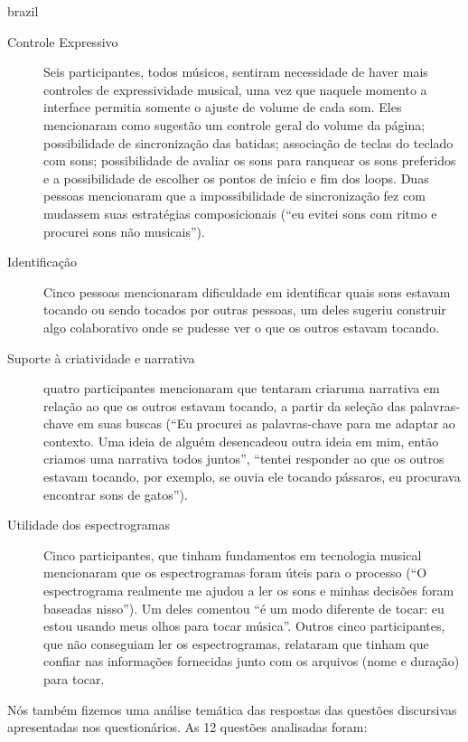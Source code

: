 \begin{otherlanguage*}{brazil}
\begin{description}
 \item[Controle Expressivo] Seis participantes, todos músicos, sentiram necessidade de haver mais controles de expressividade musical, uma vez que naquele momento a interface permitia somente o ajuste de volume de cada som. Eles mencionaram como sugestão um controle geral do volume da página; possibilidade de sincronização das batidas; associação de teclas do teclado com sons; possibilidade de avaliar os sons para ranquear os sons preferidos e a possibilidade de escolher os pontos de início e fim dos loops. Duas pessoas mencionaram que a impossibilidade de sincronização fez com mudassem suas estratégias composicionais (``eu evitei sons com ritmo e procurei sons não musicais'').

  \item[Identificação] Cinco pessoas mencionaram dificuldade em identificar quais sons estavam tocando ou sendo tocados por outras pessoas, um deles sugeriu construir algo colaborativo onde se pudesse ver o que os outros estavam tocando.

\item[Suporte à criatividade e narrativa] quatro participantes mencionaram que tentaram criaruma narrativa em relação ao que os outros estavam tocando, a partir da seleção das palavras-chave em suas buscas (``Eu procurei as palavras-chave para me adaptar ao contexto. Uma ideia de alguém desencadeou outra ideia em mim, então criamos uma narrativa todos juntos'', ``tentei responder ao que os outros estavam tocando, por exemplo, se ouvia ele tocando pássaros, eu procurava encontrar sons de gatos'').

\item[Utilidade dos espectrogramas] Cinco participantes, que tinham fundamentos em tecnologia musical mencionaram que os espectrogramas foram úteis para o processo (``O espectrograma realmente me ajudou a ler os sons e minhas decisões foram baseadas nisso''). Um deles comentou ``é um modo diferente de tocar: eu estou usando meus olhos para tocar música''. Outros cinco participantes, que não conseguiam ler os espectrogramas, relataram que tinham que confiar nas informações fornecidas junto com os arquivos (nome e duração) para tocar.

\end{description}

Nós também fizemos uma análise temática das respostas das questões discursivas apresentadas nos questionários. As 12 questões analisadas foram: 

\begin{itemize}


\end{itemize}
\end{otherlanguage*}
